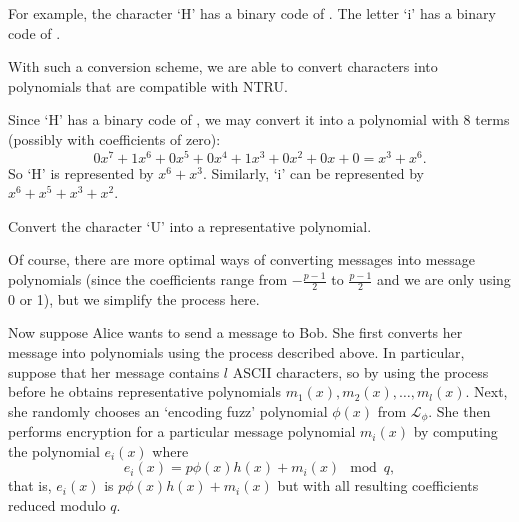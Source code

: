 \begin{example}
    For example, the character `H' has a binary code of . The letter `i' has a binary code of .
\end{example}

With such a conversion scheme, we are able to convert characters into polynomials that are compatible with NTRU.

\begin{example}
    Since `H' has a binary code of , we may convert it into a polynomial with 8 terms (possibly with coefficients of zero):
    \[
        0x^7 + 1x^6 + 0x^5 + 0x^4 + 1x^3 + 0x^2 + 0x + 0 = x^3 + x^6.
    \]
    So `H' is represented by $x^6 + x^3$. Similarly, `i' can be represented by $x^6 + x^5 + x^3 + x^2$.
\end{example}

\begin{exercise}
    Convert the character `U' into a representative polynomial.
\end{exercise}

Of course, there are more optimal ways of converting messages into message polynomials (since the coefficients range from $-\frac{p-1}2$ to $\frac{p-1}2$ and we are only using 0 or 1), but we simplify the process here.

Now suppose Alice wants to send a message to Bob. She first converts her message into polynomials using the process described above. In particular, suppose that her message contains $l$ ASCII characters, so by using the process before he obtains representative polynomials $m_1(x), m_2(x), \dots, m_l(x)$. Next, she randomly chooses an `encoding fuzz' polynomial $\phi(x)$ from $\mathcal{L}_\phi$. She then performs encryption for a particular message polynomial $m_i(x)$ by computing the polynomial $e_i(x)$ where
\[
    e_i(x) = p\phi(x)h(x) + m_i(x) \mod q,
\]
that is, $e_i(x)$ is $p\phi(x)h(x) + m_i(x)$ but with all resulting coefficients reduced modulo $q$.

